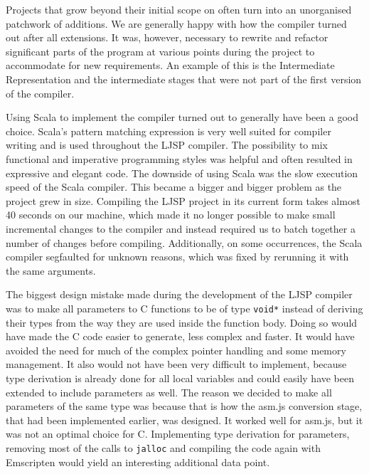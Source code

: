 \documentclass[11pt]{report}
\begin{document}
Projects that grow beyond their initial scope on often turn into an unorganised patchwork of additions. We are generally happy with how the compiler turned out after all extensions. It was, however, necessary to rewrite and refactor significant parts of the program at various points during the project to accommodate for new requirements. An example of this is the Intermediate Representation and the intermediate stages that were not part of the first version of the compiler.

Using Scala to implement the compiler turned out to generally have been a good choice. Scala's pattern matching expression is very well suited for compiler writing and is used throughout the LJSP compiler. The possibility to mix functional and imperative programming styles was helpful and often resulted in expressive and elegant code. The downside of using Scala was the slow execution speed of the Scala compiler. This became a bigger and bigger problem as the project grew in size. Compiling the LJSP project in its current form takes almost 40 seconds on our machine, which made it no longer possible to make small incremental changes to the compiler and instead required us to batch together a number of changes before compiling. Additionally, on some occurrences, the Scala compiler segfaulted for unknown reasons, which was fixed by rerunning it with the same arguments.

The biggest design mistake made during the development of the LJSP compiler was to make all parameters to C functions to be of type \texttt{void*} instead of deriving their types from the way they are used inside the function body. Doing so would have made the C code easier to generate, less complex and faster. It would have avoided the need for much of the complex pointer handling and some memory management. It also would not have been very difficult to implement, because type derivation is already done for all local variables and could easily have been extended to include parameters as well. The reason we decided to make all parameters of the same type was because that is how the asm.js conversion stage, that had been implemented earlier, was designed. It worked well for asm.js, but it was not an optimal choice for C. Implementing type derivation for parameters, removing most of the calls to \texttt{jalloc} and compiling the code again with Emscripten would yield an interesting additional data point.
\end{document}
